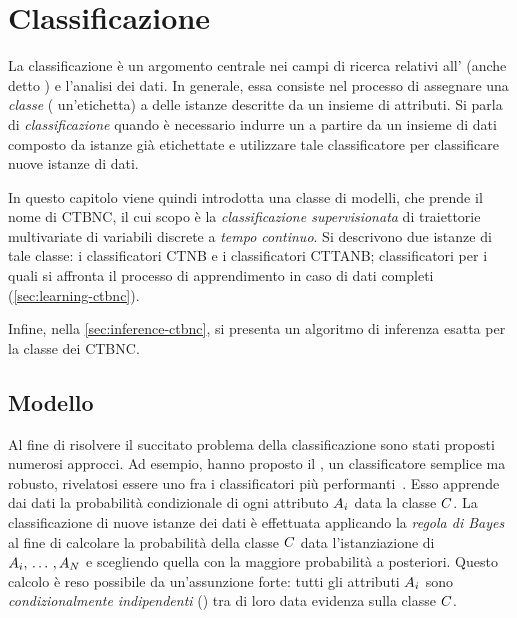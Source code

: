 
\chapter{Classificazione}
\label{cap:ctbnc}
La classificazione è un argomento centrale nei campi di ricerca relativi all' (anche detto ) e l'analisi dei dati. In generale, essa consiste nel processo di assegnare una \emph{classe} (\ie{} un'etichetta) a delle istanze descritte da un insieme di attributi. Si parla di \emph{classificazione } quando è necessario indurre un  a partire da un insieme di dati composto da istanze già etichettate e utilizzare tale classificatore per classificare nuove istanze di dati.

In questo capitolo viene quindi introdotta una classe di modelli, che prende il nome di \acf{CTBNC}, il cui scopo è la \emph{classificazione supervisionata} di traiettorie multivariate di variabili discrete a \emph{tempo continuo}. Si descrivono due istanze di tale classe: i classificatori \acf{CTNB} e i classificatori \acf{CTTANB}; classificatori per i quali si affronta il processo di apprendimento in caso di dati completi (\autoref{sec:learning-ctbnc}).

Infine, nella \autoref{sec:inference-ctbnc}, si presenta un algoritmo di inferenza esatta per la classe dei \acs{CTBNC}.

\section{Modello}\label{sec:ctbnc-model}
Al fine di risolvere il succitato problema della classificazione sono stati proposti numerosi approcci. Ad esempio, \citet{DudaHart1973} hanno proposto il \lwcase \nb{} \class{}, un classificatore semplice ma robusto, rivelatosi essere uno fra i classificatori più performanti~\citep{Langley1992}. Esso apprende dai dati la probabilità condizionale di ogni attributo $\mathnormal{A}_i$ data la classe $\mathnormal{C}$. La classificazione di nuove istanze dei dati è effettuata applicando la \emph{regola di Bayes} al fine di calcolare la probabilità della classe $\mathnormal{C}$ data l'istanziazione di $\mathnormal{A}_i,\,\dotsc\,,\mathnormal{A}_N$ e scegliendo quella con la maggiore probabilità a posteriori. Questo calcolo è reso possibile da un'assunzione forte: tutti gli attributi $\mathnormal{A}_i$ sono \emph{condizionalmente indipendenti} () tra di loro data evidenza sulla classe $\mathnormal{C}$.

